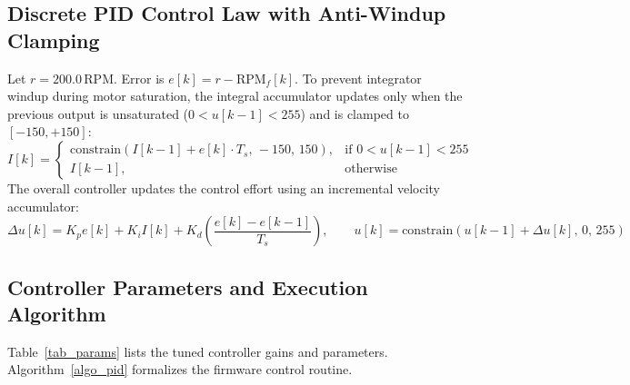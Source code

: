 \documentclass[11pt,a4paper]{article}
\begin{document}
\subsection{Discrete PID Control Law with Anti-Windup Clamping}
Let $r = 200.0\,\text{RPM}$. Error is $e[k] = r - \text{RPM}_f[k]$. To prevent integrator windup during motor saturation, the integral accumulator updates only when the previous output is unsaturated ($0 < u[k-1] < 255$) and is clamped to $[-150, +150]$:
\begin{equation}
    I[k] = \begin{cases}
        \text{constrain}(I[k-1] + e[k] \cdot T_s,\, -150,\, 150), & \text{if } 0 < u[k-1] < 255 \\
        I[k-1], & \text{otherwise}
    \end{cases}
    \label{eq_antiwindup}
\end{equation}
The overall controller updates the control effort using an incremental velocity accumulator:
\begin{equation}
    \Delta u[k] = K_p e[k] + K_i I[k] + K_d \left(\frac{e[k] - e[k-1]}{T_s}\right), \qquad u[k] = \text{constrain}(u[k-1] + \Delta u[k],\, 0,\, 255)
    \label{eq_pid_law}
\end{equation}

\subsection{Controller Parameters and Execution Algorithm}
Table~\ref{tab_params} lists the tuned controller gains and parameters. Algorithm~\ref{algo_pid} formalizes the firmware control routine.
\end{document}
